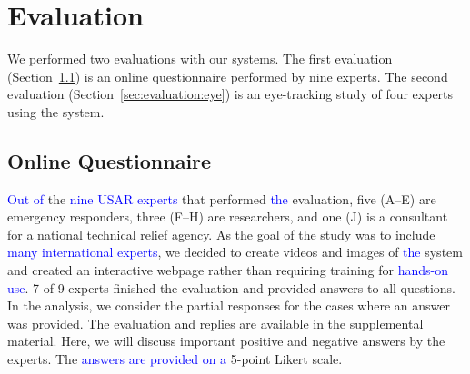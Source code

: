 \documentclass{egpubl}
\newcommand{\diff}[1]{\textcolor{blue}{#1}}
\begin{document}
\section{Evaluation} \label{sec:evaluation}
We performed two evaluations with our systems. The first evaluation (Section~\ref{sec:evaluation:question}) is an online questionnaire performed by nine experts. The second evaluation (Section~\ref{sec:evaluation:eye}) is an eye-tracking study of four experts using the system.

\subsection{Online Questionnaire} \label{sec:evaluation:question}
\diff{Out of} the \diff{nine USAR experts} that performed \diff{the} evaluation, five (A--E) are emergency responders, three (F--H) are researchers, and one (J) is a consultant for a national technical relief agency. As the goal of the study was to include \diff{many international experts}, we decided to create videos and images of \diff{the} system and created an interactive webpage rather than requiring training for \diff{hands-on use}. 7 of 9 experts finished the evaluation and provided answers to all questions. In the analysis, we consider the partial responses for the cases where an answer was provided. The evaluation and replies are available in the supplemental material. Here, we will discuss important positive and negative answers by the experts. The \diff{answers are provided on a} 5-point Likert scale.
\end{document}
